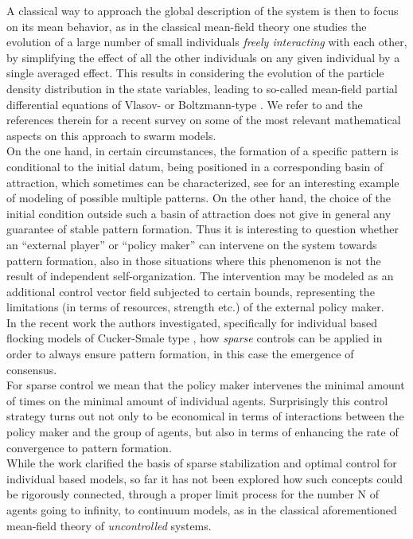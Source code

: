 \documentclass[11pt]{article}
\theoremstyle{plain}
\theoremstyle{definition}
\theoremstyle{remark}
\numberwithin{equation}{section}
\begin{document}
A classical way to approach the global description of the system is then to focus on its mean behavior, 
 as in the classical mean-field theory one studies the evolution of a large number of small individuals {\it freely interacting} with each other, by 
simplifying the effect of all the other individuals on any given individual by a single averaged effect. This results in considering the evolution of the particle density distribution in
the state variables, leading to so-called mean-field partial differential equations of Vlasov- or Boltzmann-type \cite{1151.82351}. We refer to \cite{CCH13} and the references therein 
for a recent survey  on some of the most relevant mathematical aspects on this approach to swarm models.
\\
On the one hand, in certain circumstances, the formation of a specific pattern is conditional to the initial datum, being positioned in a corresponding basin 
of attraction, which sometimes can be characterized, see \cite{ChuDorMarBerCha07} for an interesting example of modeling of possible multiple patterns. On the other hand, the choice of the initial condition outside such a basin of attraction does not give
in general any guarantee of stable pattern formation. Thus it is interesting to question whether an ``external player'' or ``policy maker'' can intervene
on the system towards pattern formation, also in those situations where this phenomenon is not the result of independent self-organization.
The intervention may be modeled as an additional control vector field subjected to certain bounds, representing the limitations (in terms of resources, strength etc.)
of the external policy maker. \\
In the recent work \cite{CFPT} the authors investigated, specifically for individual based flocking models of Cucker-Smale type \cite{CucSma07,cusm07}, how {\it sparse} controls 
can be applied in order to always ensure pattern formation, in this case the emergence of consensus. \\
For sparse control we mean that the policy maker intervenes the minimal amount of times on the minimal amount of individual agents. Surprisingly this control
strategy turns out not only to be economical in terms of interactions between the policy maker and the group of agents, but also in terms of enhancing the
rate of convergence to pattern formation.\\
While the work \cite{CFPT} clarified the basis of sparse stabilization and optimal control for individual based models, so far it has not been explored how such 
concepts could be rigorously connected, through a proper limit process for the number N of agents going to infinity, to continuum models, as in the classical
aforementioned mean-field theory of {\it uncontrolled} systems. \\
\end{document}
